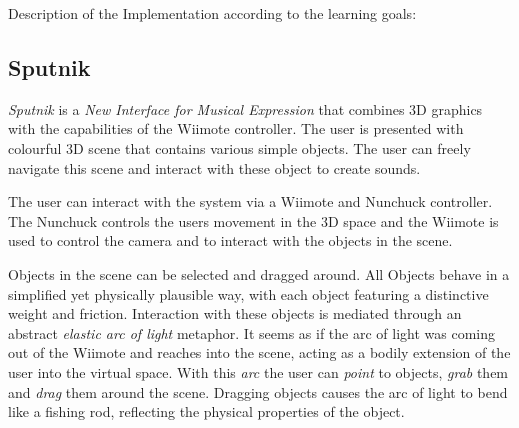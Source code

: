 \documentclass[10pt,a4paper]{scrartcl}
\begin{document}
Description of the Implementation according to the learning goals:




\subsection{Sputnik}

\emph{Sputnik} is a \emph{New Interface for Musical Expression} that combines 3D graphics with the capabilities of the Wiimote controller. The user is presented with colourful 3D scene that contains various simple objects. The user can freely navigate this scene and interact with these object to create sounds.

The user can interact with the system via a Wiimote and Nunchuck controller. The Nunchuck controls the users movement in the 3D space and the Wiimote is used to control the camera and to interact with the objects in the scene. 

Objects in the scene can be selected and dragged around. All Objects behave in a simplified yet physically plausible way, with each object featuring a distinctive weight and friction. Interaction with these objects is mediated through an abstract \emph{elastic arc of light} metaphor. It seems as if the arc of light was coming out of the Wiimote and reaches into the scene, acting as a bodily extension of the user into the virtual space. With this \emph{arc} the user can \emph{point} to objects, \emph{grab} them and \emph{drag} them around the scene. Dragging objects causes the arc of light to bend like a fishing rod, reflecting the physical properties of the object.
\end{document}
